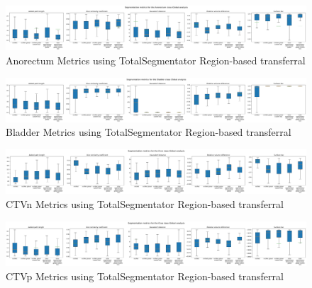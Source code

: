 \documentclass[11pt,twoside]{report}
\begin{document}
\begin{landscape}

  \begin{figure}[H]
    \centering
    \includegraphics[width=\linewidth]{../../research/source/code/data/metrics/metricsanorectum_1_combinednotable_Global_analysis.png}
    \caption{Anorectum Metrics using TotalSegmentator Region-based transferral}\label{fig:region-based-metrics-anorectum}
  \end{figure}

  \begin{figure}[H]
    \centering
    \includegraphics[width=\linewidth]{../../research/source/code/data/metrics/metricsbladder_1_combinednotable_Global_analysis.png}
    \caption{Bladder Metrics using TotalSegmentator Region-based transferral}\label{fig:region-based-metrics-bladder}
  \end{figure}

  \begin{figure}[H]
    \centering
    \includegraphics[width=\linewidth]{../../research/source/code/data/metrics/metricsctvn_1_combinednotable_Global_analysis.png}
    \caption{CTVn Metrics using TotalSegmentator Region-based transferral}\label{fig:region-based-metrics-ctvn}
  \end{figure}

  \begin{figure}[H]
    \centering
    \includegraphics[width=\linewidth]{../../research/source/code/data/metrics/metricsctvp_1_combinednotable_Global_analysis.png}
    \caption{CTVp Metrics using TotalSegmentator Region-based transferral}\label{fig:region-based-metrics-ctvp}
  \end{figure}


\end{landscape}
\end{document}
